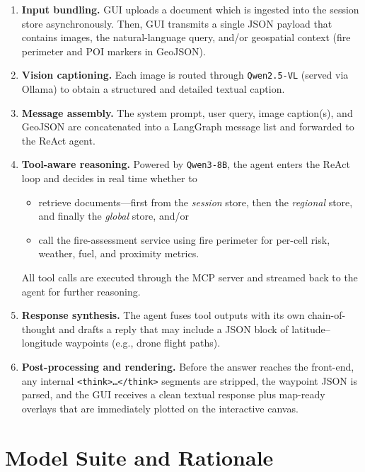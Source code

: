 \documentclass[lang=english,inputenc=utf8,fontsize=10pt]{ldvarticle}
\begin{document}
\begin{enumerate}
  \item \textbf{Input bundling.}  
        GUI uploads a document which is ingested into the session store
        asynchronously. Then, GUI transmits a single JSON payload that contains
        images, the natural-language query, and/or geospatial context (fire 
        perimeter and POI markers in GeoJSON).
  \item \textbf{Vision captioning.}  
        Each image is routed through \texttt{Qwen2.5-VL} (served via
        Ollama) to obtain a structured and detailed textual caption.
  \item \textbf{Message assembly.}  
        The system prompt, user query, image caption(s), and GeoJSON are
        concatenated into a LangGraph message list and forwarded to the
        ReAct agent.
  \item \textbf{Tool-aware reasoning.}  
        Powered by \texttt{Qwen3-8B}, the agent enters the ReAct loop and
        decides in real time whether to  
        \begin{itemize}
          \item retrieve documents—first from the \emph{session} store,
                then the \emph{regional} store, and finally the
                \emph{global} store, and/or
          \item call the fire-assessment service using fire perimeter for per-cell risk,
                weather, fuel, and proximity metrics.
        \end{itemize}
        All tool calls are executed through the MCP server and streamed
        back to the agent for further reasoning.
  \item \textbf{Response synthesis.}  
        The agent fuses tool outputs with its own chain-of-thought and
        drafts a reply that may include a JSON block of latitude–longitude
        waypoints (e.g., drone flight paths).
  \item \textbf{Post-processing and rendering.}  
        Before the answer reaches the front-end, any internal
        \texttt{\textless think\textgreater …\textless/think\textgreater}
        segments are stripped, the waypoint JSON is parsed, and the GUI
        receives a clean textual response plus map-ready overlays that are
        immediately plotted on the interactive canvas.
\end{enumerate}

\section*{Model Suite and Rationale}
\end{document}
